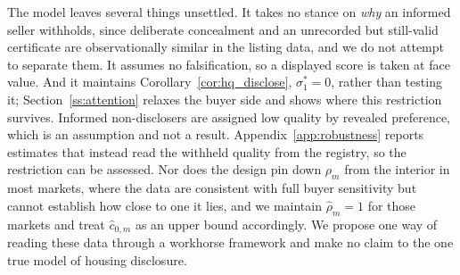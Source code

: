 The model leaves several things unsettled. It takes no stance on
\emph{why} an informed seller withholds, since deliberate concealment and an unrecorded but
still-valid certificate are observationally similar in the listing data, and we do not
attempt to separate them. It assumes no falsification, so a displayed score is taken at face
value. And it maintains Corollary~\ref{cor:hq_disclose}, $\sigma_1^*=0$, rather than testing
it; Section~\ref{ss:attention} relaxes the buyer side and shows where this restriction survives. Informed non-disclosers are assigned low quality by revealed preference, which is an
assumption and not a result. Appendix~\ref{app:robustness} reports estimates that instead read
the withheld quality from the registry, so the restriction can be assessed. Nor does the
design pin down $\rho_m$ from the interior in most markets, where the data are consistent with full
buyer sensitivity but cannot establish how close to one it lies, and we maintain
$\hat\rho_m = 1$ for those markets and treat $\hat c_{0,m}$ as an upper bound accordingly. We
propose one way of reading these data through a workhorse framework and make no claim to the one true model of housing disclosure.
